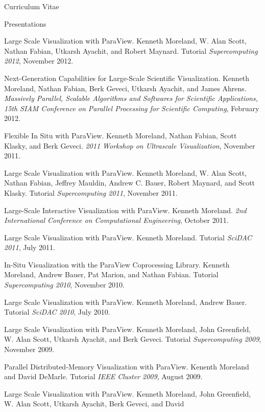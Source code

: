 \documentclass{article}
\begin{document}
\begin{cv}{Curriculum Vitae}
    \begin{cvlist}{Presentations}
    \item[Large Scale Visualization with ParaView.] Kenneth Moreland,
      W. Alan Scott, Nathan Fabian, Utkarsh Ayachit, and Robert
      Maynard. Tutorial \emph{Supercomputing 2012}, November 2012.
    \item[Next-Generation Capabilities for Large-Scale Scientific
      Visualization.] Kenneth Moreland, Nathan Fabian, Berk Geveci, Utkarsh
      Ayachit, and James Ahrens. \emph{Massively Parallel, Scalable
        Algorithms and Softwares for Scientific Applications, 15th SIAM
        Conference on Parallel Processing for Scientific Computing},
      February 2012.
    \item[Flexible In Situ with ParaView.] Kenneth Moreland, Nathan Fabian,
      Scott Klasky, and Berk Geveci. \emph{2011 Workshop on Ultrascale
        Visualization}, November 2011.
    \item[Large Scale Visualization with ParaView.] Kenneth Moreland,
      W. Alan Scott, Nathan Fabian, Jeffrey Mauldin, Andrew C. Bauer,
      Robert Maynard, and Scott Klasky. Tutorial \emph{Supercomputing
        2011}, November 2011.
    \item[Large-Scale Interactive Visualization with ParaView.] Kenneth
      Moreland. \emph{2nd International Conference on Computational
        Engineering}, October 2011.
    \item[Large Scale Visualization with ParaView.] Kenneth
      Moreland. Tutorial \emph{SciDAC 2011}, July 2011.
    \item[In-Situ Visualization with the ParaView Coprocessing Library.]
      Kenneth Moreland, Andrew Bauer, Pat Marion, and Nathan
      Fabian. Tutorial \emph{Supercomputing 2010}, November 2010.
    \item[Large Scale Visualization with ParaView.] Kenneth Moreland,
      Andrew Bauer. Tutorial \emph{SciDAC 2010}, July 2010.
    \item[Large Scale Visualization with ParaView.] Kenneth Moreland, John
      Greenfield, W. Alan Scott, Utkarsh Ayachit, and Berk Geveci. Tutorial
      \emph{Supercomputing 2009}, November 2009.
    \item[Parallel Distributed-Memory Visualization with ParaView.] Kenenth
      Moreland and David DeMarle. Tutorial \emph{IEEE Cluster 2009}, August
      2009.
    \item[Large Scale Visualization with ParaView.] Kenneth Moreland, John
      Greenfield, W. Alan Scott, Utkarsh Ayachit, Berk Geveci, and David

\end{cvlist}
\end{cv}
\end{document}
